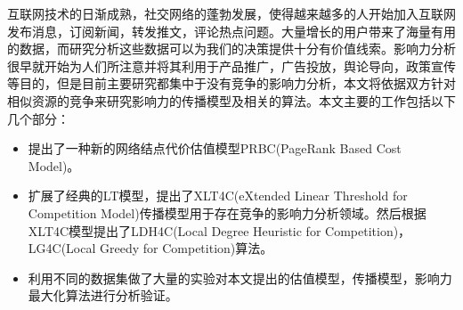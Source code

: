 
 

\makeatletter
\ifthu@bachelor\relax\else
  \ifthu@doctor
  \else
    \ifthu@master
    \fi
  \fi
\fi
\makeatother






\begin{cabstract}
互联网技术的日渐成熟，社交网络的蓬勃发展，使得越来越多的人开始加入互联网发布消息，订阅新闻，转发推文，评论热点问题。大量增长的用户带来了海量有用的数据，而研究分析这些数据可以为我们的决策提供十分有价值线索。影响力分析很早就开始为人们所注意并将其利用于产品推广，广告投放，舆论导向，政策宣传等目的，但是目前主要研究都集中于没有竞争的影响力分析，本文将依据双方针对相似资源的竞争来研究影响力的传播模型及相关的算法。本文主要的工作包括以下几个部分：
\begin{itemize}
\item 提出了一种新的网络结点代价估值模型PRBC(PageRank Based Cost Model)。
\item 扩展了经典的LT模型，提出了XLT4C(eXtended Linear Threshold for Competition Model)传播模型用于存在竞争的影响力分析领域。然后根据XLT4C模型提出了LDH4C(Local Degree Heuristic for Competition)，LG4C(Local Greedy for Competition)算法。
\item 利用不同的数据集做了大量的实验对本文提出的估值模型，传播模型，影响力最大化算法进行分析验证。
\end{itemize}
\end{cabstract}


